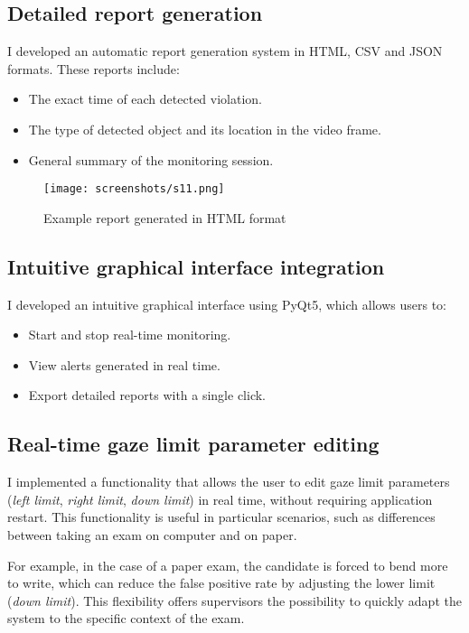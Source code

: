 \documentclass[12pt,a4paper]{article}
\begin{document}
\subsection{Detailed report generation}
I developed an automatic report generation system in HTML, CSV and JSON formats. These reports include:
\begin{itemize}
    \item The exact time of each detected violation.
    \item The type of detected object and its location in the video frame.
    \item General summary of the monitoring session.
\end{itemize}

\begin{figure}[H]
    \centering
    \texttt{[image: screenshots/s11.png]}
    \caption{Example report generated in HTML format} 
\end{figure}

\subsection{Intuitive graphical interface integration}
I developed an intuitive graphical interface using PyQt5, which allows users to:
\begin{itemize}
    \item Start and stop real-time monitoring.
    \item View alerts generated in real time.
    \item Export detailed reports with a single click.
\end{itemize}

\subsection{Real-time gaze limit parameter editing}
I implemented a functionality that allows the user to edit gaze limit parameters (\textit{left limit}, \textit{right limit}, \textit{down limit}) in real time, without requiring application restart. This functionality is useful in particular scenarios, such as differences between taking an exam on computer and on paper. 

For example, in the case of a paper exam, the candidate is forced to bend more to write, which can reduce the false positive rate by adjusting the lower limit (\textit{down limit}). This flexibility offers supervisors the possibility to quickly adapt the system to the specific context of the exam.
\end{document}

